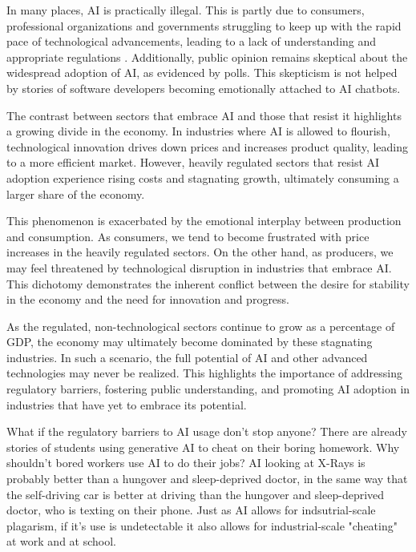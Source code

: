 In many places, AI is practically illegal. This is partly due to consumers, professional organizations and governments struggling to keep up with the rapid pace of technological advancements, leading to a lack of understanding and appropriate regulations . Additionally, public opinion remains skeptical about the widespread adoption of AI, as evidenced by polls. This skepticism is not helped by stories of software developers becoming emotionally attached to AI chatbots.

The contrast between sectors that embrace AI and those that resist it highlights a growing divide in the economy. In industries where AI is allowed to flourish, technological innovation drives down prices and increases product quality, leading to a more efficient market. However, heavily regulated sectors that resist AI adoption experience rising costs and stagnating growth, ultimately consuming a larger share of the economy.

This phenomenon is exacerbated by the emotional interplay between production and consumption. As consumers, we tend to become frustrated with price increases in the heavily regulated sectors. On the other hand, as producers, we may feel threatened by technological disruption in industries that embrace AI. This dichotomy demonstrates the inherent conflict between the desire for stability in the economy and the need for innovation and progress.

As the regulated, non-technological sectors continue to grow as a percentage of GDP, the economy may ultimately become dominated by these stagnating industries. In such a scenario, the full potential of AI and other advanced technologies may never be realized. This highlights the importance of addressing regulatory barriers, fostering public understanding, and promoting AI adoption in industries that have yet to embrace its potential.

What if the regulatory barriers to AI usage don't stop anyone? There are already stories of students using generative AI to cheat on their boring homework. Why shouldn't bored workers use AI to do their jobs? AI looking at X-Rays is probably better than a hungover and sleep-deprived doctor, in the same way that the self-driving car is better at driving than the hungover and sleep-deprived doctor, who is texting on their phone. Just as AI allows for indsutrial-scale plagarism, if it's use is undetectable it also allows for industrial-scale "cheating" at work and at school. 

